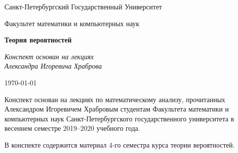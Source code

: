 \begin{titlepage}
	\centering
	
	{\Large Санкт-Петербургский Государственный Университет \par}
	
	\vspace{0.5cm}
	
	{\large Факультет математики и компьютерных наук\par}
	
	\vspace{4.5cm}
	
	{\Huge\bfseries Теория вероятностей\par}
	
	\vspace{1.5cm}
	
	{\LARGE\itshape Конспект основан на лекциях \\ Александра Игоревича Храброва\par}
	
	\vspace{1.5cm}
	
	{\large \today\par}
	\vfill
	
	\begin{minipage}{6in}
		\centering
		\hspace*{.2in}
	\end{minipage}


\end{titlepage}

\thispagestyle{empty}
\noindent Конспект основан на лекциях по математическому анализу, прочитанных Александром Игоревичем Храбровым студентам Факультета математики и компьютерных наук Санкт-Петербургского государственного университета в весеннем семестре 2019--2020 учебного года.

\vspace{0.5cm}
\noindent
В конспекте содержится материал 4-го семестра курса теории вероятностей.

